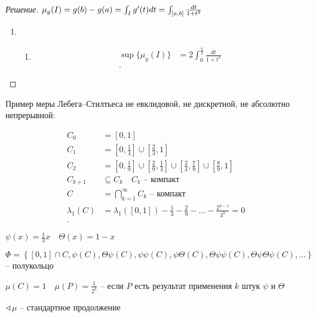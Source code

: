 \begin{proof}
    [Решение]

    $\mu_g(I) = g(b) -g(a) = \int_I g^{\prime}(t)dt = \int_{[a,b]}\frac{dt}{1 + t^2}$

    \begin{enumerate}
        \item 
        \begin{enumerate}
            \item \begin{align*}    
                \sup \{\mu_g(I)\} &= 2 \int_0^{\frac{\pi}{2}} \frac{dt}{1 + t ^2}\\
            .\end{align*}
        \end{enumerate}
    \end{enumerate}
\end{proof}

\begin{example}
    Пример меры Лебега--Стилтьеса 
    не евклидовой, не дискретной, не абсолютно непрерывной:

    \begin{align*}
        C_0 &= \left[0,1\right]\\
        C_1 &= \left[0, \frac{1}{3}\right] \cup \left[\frac{2}{3}, 1\right] \\
        C_2 &= \left[0, \frac{1}{9}\right] \cup \left[\frac{2}{9}, \frac{1}{3}\right] \cup \left[\frac{2}{3}, \frac{7}{9}\right] \cup \left[\frac{8}{9}, 1\right]  \\
        C_{k+1} &\subseteq C_k\quad C_k \text{ -- компакт}\\
        C &= \bigcap\limits_{k=1}^{\infty}C_k \text{ -- компакт}  \\
        \lambda_1(C) &= \lambda_1([0,1]) - \frac{1}{3} - \frac{2}{9}  - \ldots - \frac{2^{k-1}}{3^k} = 0\\
    .\end{align*}  

    $\psi(x) = \frac{1}{3}x\quad \Theta(x) = 1-x$
    
    \[\Phi = \left\{ [0,1] \cap C, \psi(C), \Theta\psi(C), \psi \psi(C), \psi\Theta(C), \Theta\psi\psi(C) , \Theta\psi\Theta\psi(C), \ldots \right\} \] 
    -- полукольцо

    $\mu(C) = 1\quad \mu(P) = \frac{1}{2^k}$ -- если $P$ есть результат применения $k$ штук $\psi$ и $\Theta$

    $\sphericalangle \mu$ -- стандартное продолжение
\end{example}